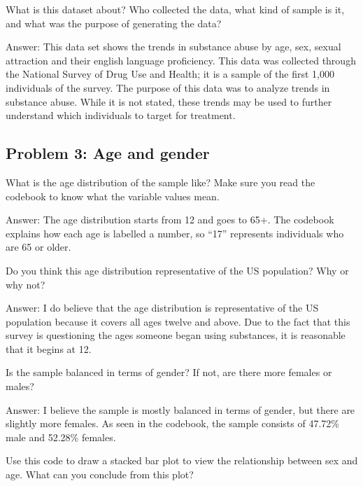 \documentclass[
]{article}
\newenvironment{Shaded}{\begin{snugshade}}{\end{snugshade}}
\newcommand{\CommentTok}[1]{\textcolor[rgb]{0.56,0.35,0.01}{\textit{#1}}}
\newcommand{\DataTypeTok}[1]{\textcolor[rgb]{0.13,0.29,0.53}{#1}}
\newcommand{\KeywordTok}[1]{\textcolor[rgb]{0.13,0.29,0.53}{\textbf{#1}}}
\newcommand{\NormalTok}[1]{#1}
\newcommand{\OperatorTok}[1]{\textcolor[rgb]{0.81,0.36,0.00}{\textbf{#1}}}
\newcommand{\OtherTok}[1]{\textcolor[rgb]{0.56,0.35,0.01}{#1}}
\newcommand{\StringTok}[1]{\textcolor[rgb]{0.31,0.60,0.02}{#1}}
\begin{document}
What is this dataset about? Who collected the data, what kind of sample
is it, and what was the purpose of generating the data?

Answer: This data set shows the trends in substance abuse by age, sex,
sexual attraction and their english language proficiency. This data was
collected through the National Survey of Drug Use and Health; it is a
sample of the first 1,000 individuals of the survey. The purpose of this
data was to analyze trends in substance abuse. While it is not stated,
these trends may be used to further understand which individuals to
target for treatment.

\hypertarget{problem-3-age-and-gender}{%
\subsection{Problem 3: Age and gender}\label{problem-3-age-and-gender}}

What is the age distribution of the sample like? Make sure you read the
codebook to know what the variable values mean.

Answer: The age distribution starts from 12 and goes to 65+. The
codebook explains how each age is labelled a number, so ``17''
represents individuals who are 65 or older.

Do you think this age distribution representative of the US population?
Why or why not?

Answer: I do believe that the age distribution is representative of the
US population because it covers all ages twelve and above. Due to the
fact that this survey is questioning the ages someone began using
substances, it is reasonable that it begins at 12.

Is the sample balanced in terms of gender? If not, are there more
females or males?

Answer: I believe the sample is mostly balanced in terms of gender, but
there are slightly more females. As seen in the codebook, the sample
consists of 47.72\% male and 52.28\% females.

Use this code to draw a stacked bar plot to view the relationship
between sex and age. What can you conclude from this plot?

\begin{Shaded}
\end{Shaded}
\end{document}
